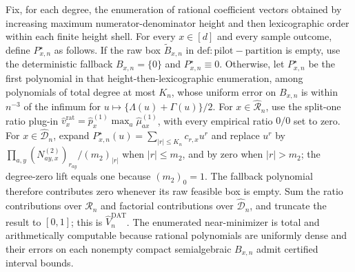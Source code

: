 Fix, for each degree, the enumeration of rational coefficient vectors obtained by increasing maximum numerator-denominator height and then lexicographic order within each finite height shell. For every \(x\in[d]\) and every sample outcome, define \(P^\star_{x,n}\) as follows. If the raw box \(\widetilde B_{x,n}\) in \(\mathrm{def:pilot-partition}\) is empty, use the deterministic fallback \(B_{x,n}=\{0\}\) and \(P^\star_{x,n}\equiv0\). Otherwise, let \(P^\star_{x,n}\) be the first polynomial in that height-then-lexicographic enumeration, among polynomials of total degree at most \(K_n\), whose uniform error on \(B_{x,n}\) is within \(n^{-3}\) of the infimum for \(u\mapsto\{\Lambda(u)+\Gamma(u)\}/2\). For \(x\in\widehat{\mathcal R}_n\), use the split-one ratio plug-in \(\widehat v_x^{\mathrm{rat}}=\widehat p_x^{(1)}\max_a\widehat\mu_{ax}^{(1)}\), with every empirical ratio \(0/0\) set to zero. For \(x\in\widehat{\mathcal D}_n\), expand \(P^\star_{x,n}(u)=\sum_{\lvert r\rvert\le K_n}c_{r,x}u^r\) and replace \(u^r\) by \(\prod_{a,y}(N^{(2)}_{ay,x})_{r_{ay}}/(m_2)_{\lvert r\rvert}\) when \(\lvert r\rvert\le m_2\), and by zero when \(\lvert r\rvert>m_2\); the degree-zero lift equals one because \((m_2)_0=1\). The fallback polynomial therefore contributes zero whenever its raw feasible box is empty. Sum the ratio contributions over \(\widehat{\mathcal R}_n\) and factorial contributions over \(\widehat{\mathcal D}_n\), and truncate the result to \([0,1]\); this is \(\widehat V_n^{\mathrm{DAT}}\). The enumerated near-minimizer is total and arithmetically computable because rational polynomials are uniformly dense and their errors on each nonempty compact semialgebraic \(B_{x,n}\) admit certified interval bounds.